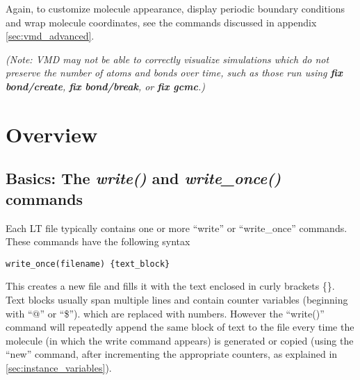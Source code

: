 \documentclass[11pt]{article}
\begin{document}
Again, to customize molecule appearance,
display periodic boundary conditions and wrap molecule coordinates,
see the commands discussed in appendix \ref{sec:vmd_advanced}.

\textit{(Note: VMD may not be able to correctly visualize simulations which do
not preserve the number of atoms and bonds over time, such as those run using 
\textbf{fix bond/create}, 
\textbf{fix bond/break}, or
\textbf{fix gcmc}.)}




\section{Overview}

\subsection{Basics: The \textit{write()} and \textit{write\_once()} commands}
\label{sec:write}
Each LT file typically contains one or more 
``write'' or ``write\_once'' commands. 
These commands have the following syntax 
\begin{verbatim}
write_once(filename) {text_block}
\end{verbatim}
This creates a new file
and fills it with the text enclosed in curly brackets \{\}.
Text blocks usually span multiple lines and contain counter variables 
(beginning with ``@'' or ``\$'').
which are replaced with numbers.
However the ``write()'' command will repeatedly append the 
same block of text to the file every time the molecule 
(in which the write command appears) is generated or copied 
(using the ``new'' command, 
after incrementing the appropriate counters,
as explained in \ref{sec:instance_variables}).

\end{document}
